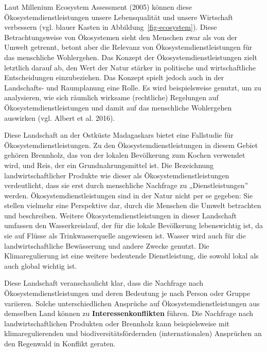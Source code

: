 \documentclass[
  nswissgerman,
  a4paper,
  DIV=11,
  numbers=noendperiod,
  oneside,
  openany]{scrreprt}
\begin{document}
Laut Millenium Ecosystem Assessment (2005) können diese
Ökosystemdienstleistungen unsere Lebensqualität und unsere Wirtschaft
verbessern (vgl. blauer Kasten in Abbildung~\ref{fig-ecosystem}). Diese
Betrachtungsweise von Ökosystemen sieht den Menschen zwar als von der
Umwelt getrennt, betont aber die Relevanz von Ökosystemdienstleistungen
für das menschliche Wohlergehen. Das Konzept der
Ökosystemdienstleistungen zielt letztlich darauf ab, den Wert der Natur
stärker in politische und wirtschaftliche Entscheidungen einzubeziehen.
Das Konzept spielt jedoch auch in der Landschafts- und Raumplanung eine
Rolle. Es wird beispielsweise genutzt, um zu analysieren, wie sich
räumlich wirksame (rechtliche) Regelungen auf Ökosystemdienstleistungen
und damit auf das menschliche Wohlergehen auswirken (vgl. {Albert et
al.} 2016).

\begin{tcolorbox}[enhanced jigsaw, arc=.35mm, bottomrule=.15mm, bottomtitle=1mm, breakable, colback=white, colbacktitle=quarto-callout-tip-color!10!white, colframe=quarto-callout-tip-color-frame, coltitle=black, left=2mm, leftrule=.75mm, opacityback=0, opacitybacktitle=0.6, rightrule=.15mm, title={Fallstudie: Ökosystemdienstleistungen in Madagaskar}, titlerule=0mm, toprule=.15mm, toptitle=1mm]

Diese Landschaft an der Ostküste Madagaskars bietet eine Fallstudie für
Ökosystemdienstleistungen. Zu den Ökosystemdienstleistungen in diesem
Gebiet gehören Brennholz, das von der lokalen Bevölkerung zum Kochen
verwendet wird, und Reis, der ein Grundnahrungsmittel ist. Die
Bezeichnung landwirtschaftlicher Produkte wie dieser als
Ökosystemdienstleistungen verdeutlicht, dass sie erst durch menschliche
Nachfrage zu „Dienstleistungen'' werden. Ökosystemdienstleistungen sind
in der Natur nicht per se gegeben: Sie stellen vielmehr eine Perspektive
dar, durch die Menschen die Umwelt betrachten und beschreiben. Weitere
Ökosystemdienstleistungen in dieser Landschaft umfassen den
Wasserkreislauf, der für die lokale Bevölkerung lebenswichtig ist, da
sie auf Flüsse als Trinkwasserquelle angewiesen ist. Wasser wird auch
für die landwirtschaftliche Bewässerung und andere Zwecke genutzt. Die
Klimaregulierung ist eine weitere bedeutende Dienstleistung, die sowohl
lokal als auch global wichtig ist.

Diese Landschaft veranschaulicht klar, dass die Nachfrage nach
Ökosystemdienstleistungen und deren Bedeutung je nach Person oder Gruppe
variieren. Solche unterschiedlichen Ansprüche auf
Ökosystemdienstleistungen aus demselben Land können zu
\textbf{Interessenkonflikten} führen. Die Nachfrage nach
landwirtschaftlichen Produkten oder Brennholz kann beispielsweise mit
klimaregulierenden und biodiversitätsfördernden (internationalen)
Ansprüchen an den Regenwald in Konflikt geraten.

\end{tcolorbox}
\end{document}
